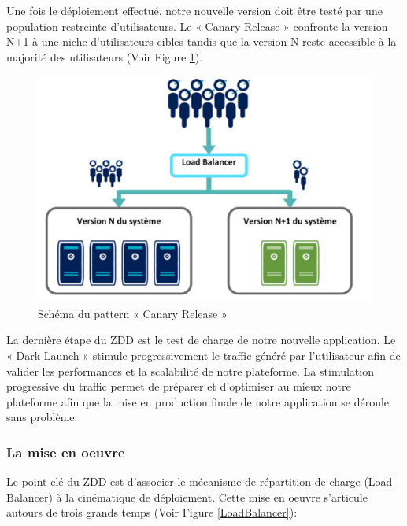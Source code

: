         Une fois le déploiement effectué, notre nouvelle version doit être testé par une population restreinte d’utilisateurs. Le « Canary Release » confronte la version N+1 à une niche d’utilisateurs cibles tandis que la version N reste accessible à la majorité des utilisateurs (Voir Figure \ref{CanaryRelease}).\\

        \begin{figure}
          \begin{center}
            \includegraphics[scale=0.6]{images/CanaryRelease.png}
          \end{center}
          \caption{Schéma du pattern « Canary Release »}
          \label{CanaryRelease}
        \end{figure}

        La dernière étape du ZDD est le test de charge de notre nouvelle application. Le « Dark Launch » stimule progressivement le traffic généré par l’utilisateur afin de valider les performances et la scalabilité de notre plateforme. La stimulation progressive du traffic permet de préparer et d’optimiser au mieux notre plateforme afin que la mise en production finale de notre application se déroule sans problème.

        \subsubsection{La mise en oeuvre}
        Le point clé du ZDD est d'associer le mécanisme de répartition de charge (Load Balancer) à la cinématique de déploiement. Cette mise en oeuvre s'articule autours de trois grands temps (Voir Figure \ref{LoadBalancer}):\\

